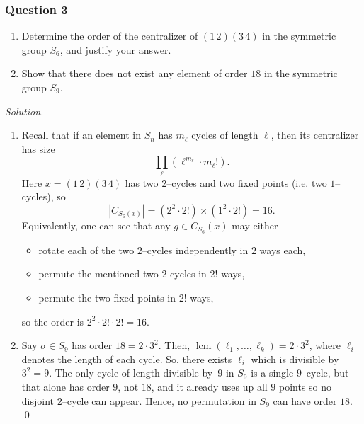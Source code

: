 \documentclass[12pt]{article}
\begin{document}
\subsubsection*{Question 3}
\begin{enumerate}[label=\textbf{(\alph*)}]
    \itemsep 0em
    \item Determine the order of the centralizer of $(1\,2)(3\,4)$ in the symmetric group $S_6$, and justify your answer.
\item Show that there does not exist any element of order $18$ in the symmetric group $S_9$.
\end{enumerate}
\noindent\emph{Solution.}\begin{enumerate}[label=\textbf{(\alph*)}]
    \itemsep 0em
    \item Recall that if an element in $S_n$ has $m_\ell$ cycles of length $\ell$, then its centralizer has size
    \[\prod_{\ell}\left(\ell^{m_\ell}\cdot m_{\ell}!\right).\]
    Here $x=\left(1\,2\right)\left(3\,4\right)$ has two $2$–cycles and two fixed points (i.e. two $1$–cycles), so \[\left|C_{S_6\left(x\right)}\right|=\left(2^2\cdot 2!\right)\times \left(1^2\cdot 2!\right)=16.\]
    Equivalently, one can see that any $g\in C_{S_6}\left(x\right)$ may either
    \begin{itemize}
    \itemsep 0em
      \item rotate each of the two $2$–cycles independently in $2$ ways each,
      \item permute the mentioned two $2$-cycles in $2!$ ways,
      \item permute the two fixed points in $2!$ ways,
    \end{itemize}
    so the order is $2^2\cdot2!\cdot2!=16$.
  \item Say $\sigma\in S_9$ has order $18=2\cdot 3^2$. Then, $\operatorname{lcm}\left(\ell_1,\ldots,\ell_k\right)=2\cdot 3^2$, where $\ell_i$ denotes the length of each cycle.
  \newline
  \newline So, there exists $\ell_i$ which is divisible by $3^2=9$. The only cycle of length divisible by 9 in $S_9$ is a single $9$–cycle, but that alone has order $9$, not $18$, and it already uses up all $9$ points so no disjoint $2$–cycle can appear. Hence, no permutation in $S_9$ can have order $18$. \qed 
\end{enumerate}
\end{document}
